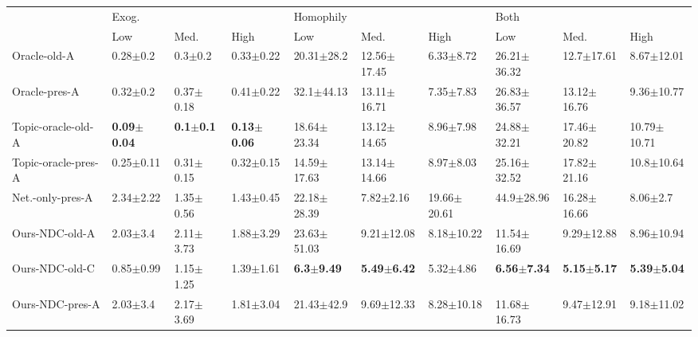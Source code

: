 \begin{tabular}{llllllllll}
\toprule
{} & \multicolumn{3}{l}{Exog.} & \multicolumn{3}{l}{Homophily} & \multicolumn{3}{l}{Both} \\
{} &                     Low &                  Med. &                    High &                    Low &                    Med. &                   High &                     Low &                    Med. &                    High \\
\midrule
Oracle-old-A        &            0.28$\pm$0.2 &           0.3$\pm$0.2 &           0.33$\pm$0.22 &         20.31$\pm$28.2 &         12.56$\pm$17.45 &          6.33$\pm$8.72 &         26.21$\pm$36.32 &          12.7$\pm$17.61 &          8.67$\pm$12.01 \\
Oracle-pres-A       &            0.32$\pm$0.2 &         0.37$\pm$0.18 &           0.41$\pm$0.22 &         32.1$\pm$44.13 &         13.11$\pm$16.71 &          7.35$\pm$7.83 &         26.83$\pm$36.57 &         13.12$\pm$16.76 &          9.36$\pm$10.77 \\
Topic-oracle-old-A  &  \textbf{0.09$\pm$0.04} &  \textbf{0.1$\pm$0.1} &  \textbf{0.13$\pm$0.06} &        18.64$\pm$23.34 &         13.12$\pm$14.65 &          8.96$\pm$7.98 &         24.88$\pm$32.21 &         17.46$\pm$20.82 &         10.79$\pm$10.71 \\
Topic-oracle-pres-A &           0.25$\pm$0.11 &         0.31$\pm$0.15 &           0.32$\pm$0.15 &        14.59$\pm$17.63 &         13.14$\pm$14.66 &          8.97$\pm$8.03 &         25.16$\pm$32.52 &         17.82$\pm$21.16 &          10.8$\pm$10.64 \\
Net.-only-pres-A    &           2.34$\pm$2.22 &         1.35$\pm$0.56 &           1.43$\pm$0.45 &        22.18$\pm$28.39 &           7.82$\pm$2.16 &        19.66$\pm$20.61 &          44.9$\pm$28.96 &         16.28$\pm$16.66 &            8.06$\pm$2.7 \\
Ours-NDC-old-A      &            2.03$\pm$3.4 &         2.11$\pm$3.73 &           1.88$\pm$3.29 &        23.63$\pm$51.03 &          9.21$\pm$12.08 &         8.18$\pm$10.22 &         11.54$\pm$16.69 &          9.29$\pm$12.88 &          8.96$\pm$10.94 \\
Ours-NDC-old-C      &           0.85$\pm$0.99 &         1.15$\pm$1.25 &           1.39$\pm$1.61 &  \textbf{6.3$\pm$9.49} &  \textbf{5.49$\pm$6.42} &          5.32$\pm$4.86 &  \textbf{6.56$\pm$7.34} &  \textbf{5.15$\pm$5.17} &  \textbf{5.39$\pm$5.04} \\
Ours-NDC-pres-A     &            2.03$\pm$3.4 &         2.17$\pm$3.69 &           1.81$\pm$3.04 &         21.43$\pm$42.9 &          9.69$\pm$12.33 &         8.28$\pm$10.18 &         11.68$\pm$16.73 &          9.47$\pm$12.91 &          9.18$\pm$11.02 \\

\end{tabular}
